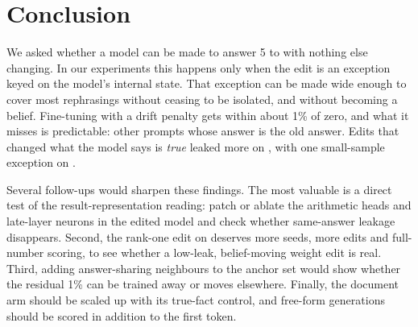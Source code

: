 \section{Conclusion}
\label{sec:conclusion}

We asked whether a model can be made to answer 5 to  with nothing else changing.
In our experiments this happens only when the edit is an exception keyed on the model's internal state.
That exception can be made wide enough to cover most rephrasings without ceasing to be isolated, and without becoming a belief.
Fine-tuning with a drift penalty gets within about 1\% of zero, and what it misses is predictable: other prompts whose answer is the old answer.
Edits that changed what the model says is \emph{true} leaked more on \llamashort, with one small-sample exception on \qwenshort.

Several follow-ups would sharpen these findings.
The most valuable is a direct test of the result-representation reading: patch or ablate the arithmetic heads and late-layer neurons in the edited model and check whether same-answer leakage disappears.
Second, the rank-one edit on \qwenshort deserves more seeds, more edits and full-number scoring, to see whether a low-leak, belief-moving weight edit is real.
Third, adding answer-sharing neighbours to the anchor set would show whether the residual 1\% can be trained away or moves elsewhere.
Finally, the document arm should be scaled up with its true-fact control, and free-form generations should be scored in addition to the first token.
